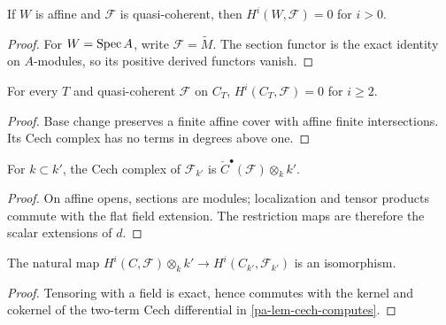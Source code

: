 \begin{lemma}
  \label{pa-lem-affine-vanishing}
  \cite{stacks-project}
  If \(W\) is affine and \(\mathcal F\) is quasi-coherent, then
  \(H^i(W,\mathcal F)=0\) for \(i>0\).
\end{lemma}

\begin{proof}
  For \(W=\operatorname{Spec} A\), write \(\mathcal F=\widetilde M\).  The section functor
  is the exact identity on \(A\)-modules, so its positive derived functors
  vanish.
\end{proof}

\begin{lemma}
  \label{pa-lem-h2-vanishing}
  \cite{stacks-project}
  For every \(T\) and quasi-coherent \(\mathcal F\) on \(C_T\),
  \(H^i(C_T,\mathcal F)=0\) for \(i\ge2\).
\end{lemma}

\begin{proof}
  Base change preserves a finite affine cover with affine finite intersections.
  Its Cech complex has no terms in degrees above one.
\end{proof}

\begin{proposition}
  \label{pa-prop-cech-base-change}
  \cite{stacks-project}
  For \(k\subset k'\), the Cech complex of \(\mathcal F_{k'}\) is
  \(\check C^\bullet(\mathcal F)\otimes_k k'\).
\end{proposition}

\begin{proof}
  On affine opens, sections are modules; localization and tensor products
  commute with the flat field extension.  The restriction maps are therefore
  the scalar extensions of \(d\).
\end{proof}

\begin{lemma}
  \label{pa-lem-flat-cohomology}
  \cite{stacks-project}
  The natural map
  \(H^i(C,\mathcal F)\otimes_k k'\to H^i(C_{k'},\mathcal F_{k'})\)
  is an isomorphism.
\end{lemma}

\begin{proof}
  Tensoring with a field is exact, hence commutes with the kernel and cokernel
  of the two-term Cech differential in \ref{pa-lem-cech-computes}.
\end{proof}

